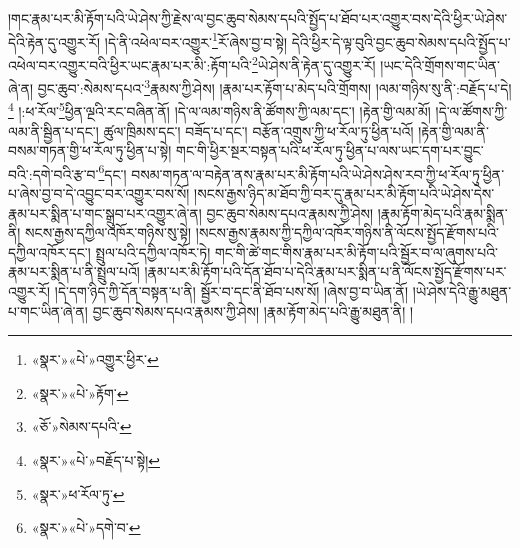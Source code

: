 །གང་རྣམ་པར་མི་རྟོག་པའི་ཡེ་ཤེས་ཀྱི་རྗེས་ལ་བྱང་ཆུབ་སེམས་དཔའི་སྤྱོད་པ་ཐོབ་པར་འགྱུར་བས་དེའི་ཕྱིར་ཡེ་ཤེས་དེའི་རྟེན་དུ་འགྱུར་རོ། །དེ་ནི་འཕེལ་བར་འགྱུར་\footnote{«སྣར་»«པེ་»འགྱུར་ཕྱིར་}རོ་ཞེས་བྱ་བ་སྟེ། དེའི་ཕྱིར་དེ་ལྟ་བུའི་བྱང་ཆུབ་སེམས་དཔའི་སྤྱོད་པ་འཕེལ་བར་འགྱུར་བའི་ཕྱིར་ཡང་རྣམ་པར་མི་:རྟོག་པའི་\footnote{«སྣར་»«པེ་»རྟོག་}ཡེ་ཤེས་ནི་རྟེན་དུ་འགྱུར་རོ། །ཡང་དེའི་གྲོགས་གང་ཡིན་ཞེ་ན། བྱང་ཆུབ་:སེམས་དཔའ་\footnote{«ཅོ་»སེམས་དཔའི་}རྣམས་ཀྱི་ཤེས། །རྣམ་པར་རྟོག་པ་མེད་པའི་གྲོགས། །ལམ་གཉིས་སུ་ནི་:བརྗོད་པ་དེ།\footnote{«སྣར་»«པེ་»བརྗོད་པ་སྟེ།} །:ཕ་རོལ་\footnote{«སྣར་»ཕ་རོལ་ཏུ་}ཕྱིན་ལྔའི་རང་བཞིན་ནོ། །དེ་ལ་ལམ་གཉིས་ནི་ཚོགས་ཀྱི་ལམ་དང་། །རྟེན་གྱི་ལམ་མོ། །དེ་ལ་ཚོགས་ཀྱི་ལམ་ནི་སྦྱིན་པ་དང་། ཚུལ་ཁྲིམས་དང་། བཟོད་པ་དང་། བརྩོན་འགྲུས་ཀྱི་ཕ་རོལ་ཏུ་ཕྱིན་པའོ། །རྟེན་གྱི་ལམ་ནི་བསམ་གཏན་གྱི་ཕ་རོལ་ཏུ་ཕྱིན་པ་སྟེ། གང་གི་ཕྱིར་སྔར་བསྟན་པའི་ཕ་རོལ་ཏུ་ཕྱིན་པ་ལས་ཡང་དག་པར་བྱུང་བའི་:དགེ་བའི་རྩ་བ་\footnote{«སྣར་»«པེ་»དགེ་བ་}དང་། བསམ་གཏན་ལ་བརྟེན་ནས་རྣམ་པར་མི་རྟོག་པའི་ཡེ་ཤེས་ཤེས་རབ་ཀྱི་ཕ་རོལ་ཏུ་ཕྱིན་པ་ཞེས་བྱ་བ་དེ་འབྱུང་བར་འགྱུར་བས་སོ། །སངས་རྒྱས་ཉིད་མ་ཐོབ་ཀྱི་བར་དུ་རྣམ་པར་མི་རྟོག་པའི་ཡེ་ཤེས་དེས་རྣམ་པར་སྨིན་པ་གང་སྒྲུབ་པར་འགྱུར་ཞེ་ན། བྱང་ཆུབ་སེམས་དཔའ་རྣམས་ཀྱི་ཤེས། །རྣམ་རྟོག་མེད་པའི་རྣམ་སྨིན་ནི། སངས་རྒྱས་དཀྱིལ་འཁོར་གཉིས་སུ་སྟེ། །སངས་རྒྱས་རྣམས་ཀྱི་དཀྱིལ་འཁོར་གཉིས་ནི་ལོངས་སྤྱོད་རྫོགས་པའི་དཀྱིལ་འཁོར་དང་། སྤྲུལ་པའི་དཀྱིལ་འཁོར་ཏེ། གང་གི་ཚེ་གང་གིས་རྣམ་པར་མི་རྟོག་པའི་སྦྱོར་བ་ལ་ཞུགས་པའི་རྣམ་པར་སྨིན་པ་ནི་སྤྲུལ་པའོ། །རྣམ་པར་མི་རྟོག་པའི་དོན་ཐོབ་པ་དེའི་རྣམ་པར་སྨིན་པ་ནི་ལོངས་སྤྱོད་རྫོགས་པར་འགྱུར་རོ། །དེ་དག་ཉིད་ཀྱི་དོན་བསྟན་པ་ནི། སྦྱོར་བ་དང་ནི་ཐོབ་པས་སོ། །ཞེས་བྱ་བ་ཡིན་ནོ། །ཡེ་ཤེས་དེའི་རྒྱུ་མཐུན་པ་གང་ཡིན་ཞེ་ན། བྱང་ཆུབ་སེམས་དཔའ་རྣམས་ཀྱི་ཤེས། །རྣམ་རྟོག་མེད་པའི་རྒྱུ་མཐུན་ནི། །
